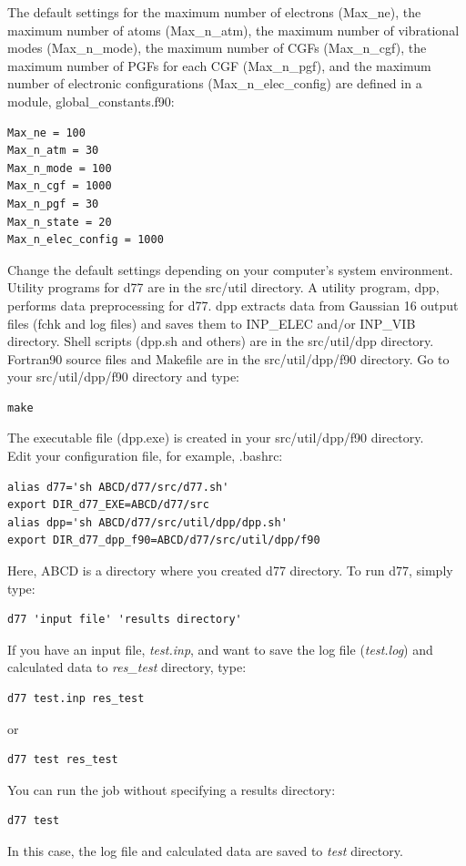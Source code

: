﻿\documentclass[11pt,a4paper,openany]{article}
\begin{document}
The default settings for 
the maximum number of electrons (Max\_ne),
the maximum number of atoms (Max\_n\_atm), 
the maximum number of vibrational modes (Max\_n\_mode),
the maximum number of CGFs (Max\_n\_cgf),
the maximum number of PGFs for each CGF (Max\_n\_pgf), 
and
the maximum number of electronic configurations (Max\_n\_elec\_config) 
are defined in a module, global\_constants.f90:
\begin{verbatim}
Max_ne = 100
Max_n_atm = 30
Max_n_mode = 100
Max_n_cgf = 1000
Max_n_pgf = 30
Max_n_state = 20
Max_n_elec_config = 1000
\end{verbatim}
Change the default settings depending on your computer's system environment.\\

Utility programs for d77 are in the src/util directory. 
A utility program, dpp, performs data preprocessing for d77.
dpp extracts data from Gaussian 16 output files (fchk and log files) and
saves them to INP\_ELEC and/or INP\_VIB directory. 
Shell scripts (dpp.sh and others) are in the src/util/dpp directory. 
Fortran90 source files and Makefile are in the src/util/dpp/f90 directory. 
Go to your src/util/dpp/f90 directory and type:
\begin{verbatim}
make
\end{verbatim}
The executable file (dpp.exe) is created in your src/util/dpp/f90 directory.\\

Edit your configuration file, for example, .bashrc:
\begin{verbatim} 
alias d77='sh ABCD/d77/src/d77.sh'
export DIR_d77_EXE=ABCD/d77/src
alias dpp='sh ABCD/d77/src/util/dpp/dpp.sh'
export DIR_d77_dpp_f90=ABCD/d77/src/util/dpp/f90
\end{verbatim} 
Here, ABCD is a directory where you created d77 directory.
To run d77, simply type:
\begin{verbatim} 
d77 'input file' 'results directory'
\end{verbatim}
If you have an input file, \textit{test.inp}, and want to save the log file (\textit{test.log}) and calculated data to \textit{res\_test} directory, type:
\begin{verbatim} 
d77 test.inp res_test
\end{verbatim}
or 
\begin{verbatim} 
d77 test res_test
\end{verbatim}
You can run the job without specifying a results directory:
\begin{verbatim} 
d77 test
\end{verbatim}
In this case, the log file and calculated data are saved to \textit{test} directory.
\end{document}
